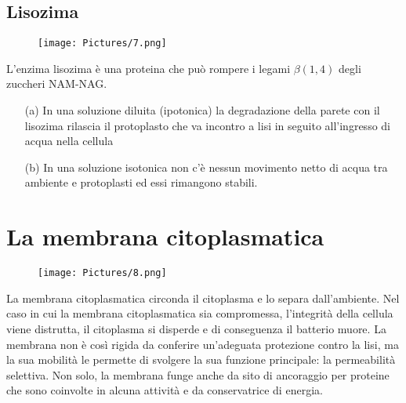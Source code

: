 \subsection{Lisozima}
\begin{multicols}{2}
\begin{figure}[H]
	\texttt{[image: Pictures/7.png]}
\end{figure} 
L’enzima lisozima è una proteina che può rompere i legami $\beta(1, 4)$ degli zuccheri NAM-NAG.
\begin{itemize}
\item[(a)] In una soluzione diluita (ipotonica) la degradazione della parete con il lisozima rilascia il protoplasto che va incontro a lisi in seguito 
all’ingresso di acqua nella cellula
\item[(b)] In una soluzione isotonica non c’è nessun movimento netto di acqua tra ambiente e protoplasti ed essi rimangono stabili.
\end{itemize}
\end{multicols}
\section{La membrana citoplasmatica}
\begin{figure}[H]
	\texttt{[image: Pictures/8.png]}
\end{figure}
La membrana citoplasmatica circonda il citoplasma e lo separa dall’ambiente. Nel caso in cui la membrana citoplasmatica sia compromessa, l’integrità della 
cellula viene distrutta, il citoplasma si disperde e di conseguenza il batterio muore. La membrana non è così rigida da conferire un’adeguata protezione 
contro la lisi, ma la sua mobilità le permette di svolgere la sua funzione principale: la permeabilità selettiva. Non solo, la membrana funge 
anche da sito di ancoraggio per proteine che sono coinvolte in alcuna attività e da conservatrice di energia.
